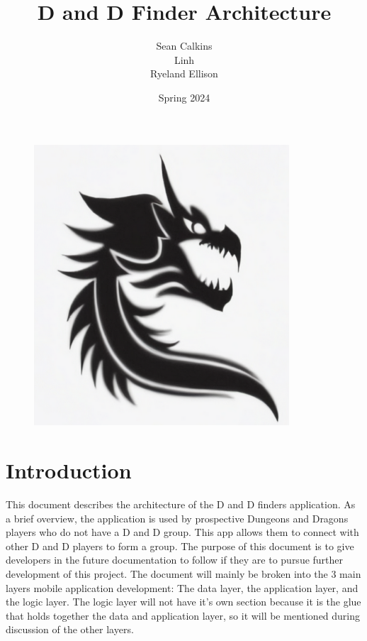 \documentclass{article}
\title{D and D Finder Architecture}
\author{Sean Calkins \\ Linh \\ Ryeland Ellison}
\date{Spring 2024}
\begin{document}
	\begin{figure}
		\centering
		\includegraphics[width=0.85\textwidth]{dd_dragon.png}
	\end{figure}

\maketitle
\newpage
	\section{Introduction}
	This document describes the architecture of the D and D finders application. As a brief 
	overview, the application is used by prospective Dungeons and Dragons players who do not
	have a D and D group. This app allows them to connect with other D and D players to form
	a group.
	The purpose of this document is to give developers in the future documentation to follow if they
	are to pursue further development of this project. The document will mainly be broken into the 
	3 main layers mobile application development: The data layer, the application layer, and the logic
	layer. The logic layer will not have it's own section because it is the glue that holds together 
	the data and application layer, so it will be mentioned during discussion of the other layers. 
\end{document}
